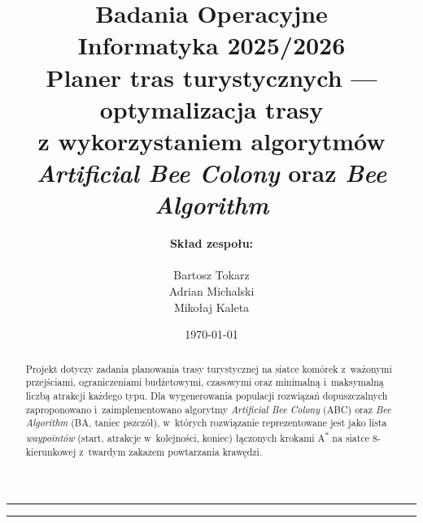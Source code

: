 \documentclass[11pt,a4paper]{article}
\title{
    \vspace{-1.5cm}
    \textbf{Badania Operacyjne} \\[2pt]
    \large Informatyka 2025/2026 \\[18pt]
    \textbf{Planer tras turystycznych --- optymalizacja trasy} \\[6pt]
    \large z wykorzystaniem algorytmów \emph{Artificial Bee Colony} oraz \emph{Bee Algorithm}
}
\author{
    \textbf{Skład zespołu:} \\[4pt]
    \begin{tabular}{l}
        Bartosz Tokarz \\
        Adrian Michalski \\
        Mikołaj Kaleta \\
    \end{tabular}
}
\date{\today}
\begin{document}
\maketitle
\thispagestyle{empty}

\begin{abstract}
\noindent
Projekt dotyczy zadania planowania trasy turystycznej na siatce komórek z~ważonymi
przejściami, ograniczeniami budżetowymi, czasowymi oraz minimalną i~maksymalną liczbą
atrakcji każdego typu. Dla wygenerowania populacji rozwiązań dopuszczalnych
zaproponowano i~zaimplementowano algorytmy \emph{Artificial Bee Colony} (ABC) oraz
\emph{Bee Algorithm} (BA, taniec pszczół), w~których rozwiązanie reprezentowane jest
jako lista \emph{waypointów} (start, atrakcje w~kolejności, koniec) łączonych krokami
A\textsuperscript{*} na siatce 8-kierunkowej z~twardym zakazem powtarzania krawędzi.
\end{abstract}

\vspace{0.4cm}
\hrule
\tableofcontents
\hrule
\vspace{0.6cm}









\end{document}
